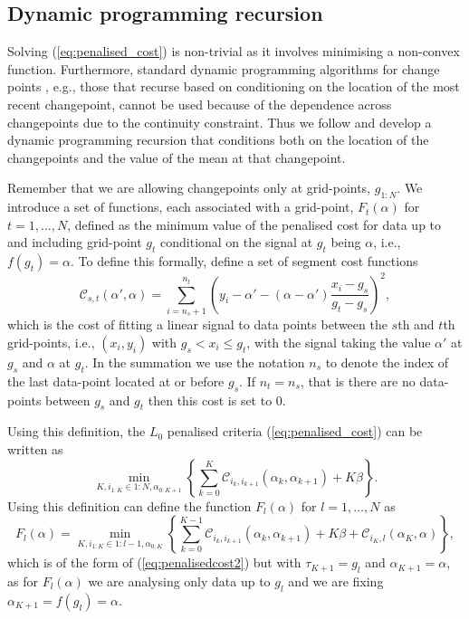 \documentclass[article]{jss}
\begin{document}
\subsection{Dynamic programming recursion}

Solving (\ref{eq:penalised_cost}) is non-trivial as it involves minimising a non-convex function. Furthermore, standard dynamic programming algorithms for change points \citep{maidstone2017optimal}, e.g., those that recurse based on conditioning on the location of the most recent changepoint,  cannot be used because of the dependence across changepoints due to the continuity constraint. Thus we follow \cite{fearnhead2019detecting} and develop a dynamic programming recursion that conditions both on the location of the changepoints and the value of the mean at that changepoint.

Remember that we are allowing changepoints only at grid-points, $g_{1:N}$. We introduce a set of functions, each associated with a grid-point, $F_t(\alpha)$ for $t=1,\ldots,N$, defined as the minimum value of the penalised cost for data up to and including grid-point $g_t$ conditional on the signal at $g_t$ being $\alpha$, i.e., $f(g_t)=\alpha$. To define this formally, define a set of segment cost functions
\[
\mathcal{C}_{s,t}(\alpha',\alpha) = \sum_{i=n_s+1}^{n_t} \left(y_i -\alpha' - (\alpha-\alpha')\frac{x_i-g_s}{g_t-g_s} \right)^2,
\]
which is the cost of fitting a linear signal to data points between the $s$th and $t$th grid-points, i.e., $(x_i,y_i)$ with $g_s<x_i\leq g_t$, with the signal taking the value $\alpha'$ at $g_s$ and $\alpha$ at $g_t$. In the summation we use the notation $n_s$ to denote the index of the last data-point located at or before $g_s$. If $n_t=n_s$, that is there are no data-points between $g_s$ and $g_t$ then this cost is set to 0.

Using this definition, the $L_0$ penalised criteria (\ref{eq:penalised_cost}) can be written as
\begin{equation} \label{eq:penalisedcost2}
\min_{K,i_{1:K}\in {1:N}, \alpha_{0:K+1} }  \left\{
\sum_{k=0}^K \mathcal{C}_{i_k,i_{k+1}}(\alpha_k,\alpha_{k+1})
+K \beta
\right\}.
\end{equation}
Using this definition can define the function $F_l(\alpha)$ for $l=1,\ldots,N$ as
\[
F_l(\alpha)=
\min_{K,i_{1:K}\in {1:l-1}, \alpha_{0:K} } \left\{
\sum_{k=0}^{K-1} \mathcal{C}_{i_k,i_{k+1}}(\alpha_k,\alpha_{k+1})
+K\beta
+\mathcal{C}_{i_K,l}(\alpha_K,\alpha)
\right\},
\]
which is of the form of (\ref{eq:penalisedcost2}) but with $\tau_{K+1}=g_l$ and $\alpha_{K+1}=\alpha$, as for $F_l(\alpha)$ we are analysing only data up to $g_l$ and we are fixing $\alpha_{K+1}=f(g_l)=\alpha$.
\end{document}
